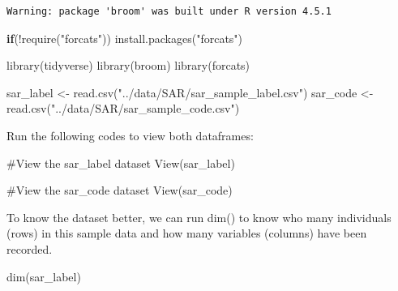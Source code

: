 \documentclass[
  letterpaper,
  DIV=11,
  numbers=noendperiod]{scrreprt}
\newenvironment{Shaded}{\begin{snugshade}}{\end{snugshade}}
\newcommand{\CommentTok}[1]{\textcolor[rgb]{0.37,0.37,0.37}{#1}}
\newcommand{\ControlFlowTok}[1]{\textcolor[rgb]{0.00,0.23,0.31}{\textbf{#1}}}
\newcommand{\FunctionTok}[1]{\textcolor[rgb]{0.28,0.35,0.67}{#1}}
\newcommand{\NormalTok}[1]{\textcolor[rgb]{0.00,0.23,0.31}{#1}}
\newcommand{\OtherTok}[1]{\textcolor[rgb]{0.00,0.23,0.31}{#1}}
\newcommand{\SpecialCharTok}[1]{\textcolor[rgb]{0.37,0.37,0.37}{#1}}
\newcommand{\StringTok}[1]{\textcolor[rgb]{0.13,0.47,0.30}{#1}}
\begin{document}
\begin{verbatim}
Warning: package 'broom' was built under R version 4.5.1
\end{verbatim}

\begin{Shaded}
\begin{Highlighting}[]
\ControlFlowTok{if}\NormalTok{(}\SpecialCharTok{!}\FunctionTok{require}\NormalTok{(}\StringTok{"forcats"}\NormalTok{))}
  \FunctionTok{install.packages}\NormalTok{(}\StringTok{"forcats"}\NormalTok{)}

\FunctionTok{library}\NormalTok{(tidyverse)}
\FunctionTok{library}\NormalTok{(broom)}
\FunctionTok{library}\NormalTok{(forcats)}
\end{Highlighting}
\end{Shaded}

\begin{Shaded}
\begin{Highlighting}[]
\NormalTok{sar\_label }\OtherTok{\textless{}{-}} \FunctionTok{read.csv}\NormalTok{(}\StringTok{"../data/SAR/sar\_sample\_label.csv"}\NormalTok{)}
\NormalTok{sar\_code }\OtherTok{\textless{}{-}} \FunctionTok{read.csv}\NormalTok{(}\StringTok{"../data/SAR/sar\_sample\_code.csv"}\NormalTok{)}
\end{Highlighting}
\end{Shaded}

Run the following codes to view both dataframes:

\begin{Shaded}
\begin{Highlighting}[]
\CommentTok{\#View the sar\_label dataset}
\FunctionTok{View}\NormalTok{(sar\_label)}
\end{Highlighting}
\end{Shaded}

\begin{Shaded}
\begin{Highlighting}[]
\CommentTok{\#View the sar\_code dataset}
\FunctionTok{View}\NormalTok{(sar\_code)}
\end{Highlighting}
\end{Shaded}

To know the dataset better, we can run dim() to know who many
individuals (rows) in this sample data and how many variables (columns)
have been recorded.

\begin{Shaded}
\begin{Highlighting}[]
\FunctionTok{dim}\NormalTok{(sar\_label)}
\end{Highlighting}
\end{Shaded}
\end{document}
